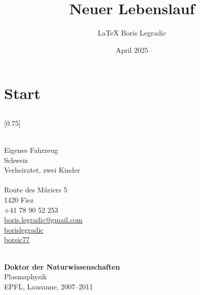 \documentclass[verylight]{simplehipstercv}
\title{Neuer Lebenslauf}
\author{\LaTeX{} Boris Legradic}
\date{April 2025}
\begin{document}
\thispagestyle{empty}

\section*{Start}

\subsection*{}
\vspace{4em}

\setlength{\columnsep}{1.5cm}
[0.75]
\begin{paracol}{2}
\paracolbackgroundoptions

\footnotesize
{\setasidefontcolour
\flushright

\bigskip \bigskip
\begin{center}
\end{center}
\bigskip \bigskip

\\[0.5em]
Eigenes Fahrzeug\\
Schweiz\\
Verheiratet, zwei Kinder\\

\bigskip \bigskip
{}\\[0.5em]
Route des Mûriers 5\\
1420 Fiez\\
+41 78 90 52 253\\

\bigskip
\href{mailto:boris.legradic@gmail.com}{boris.legradic@gmail.com }\\
\href{https://www.linkedin.com/in/borislegradic}{borislegradic }\\
\href{https://github.com/borsic77}{borsic77 }

\bigskip \bigskip
{}\\[0.5em]

\textbf{Doktor der Naturwissenschaften}\\
Plasmaphysik\\
EPFL, Lausanne, 2007–2011\\[0.5em]

}
\end{paracol}
\end{document}
